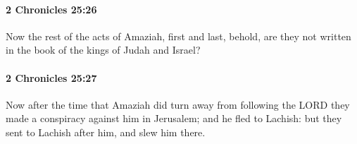 		\paragraph{2 Chronicles 25:26} %
			\label{2CHRONICLES-25-26}

			Now the rest of the acts of Amaziah, first and last, behold, are they not written in the book of the kings of Judah and Israel?


		\paragraph{2 Chronicles 25:27} %
			\label{2CHRONICLES-25-27}

			Now after the time that Amaziah did turn away from following the LORD they made a conspiracy against him in Jerusalem; and he fled to Lachish: but they sent to Lachish after him, and slew him there.


